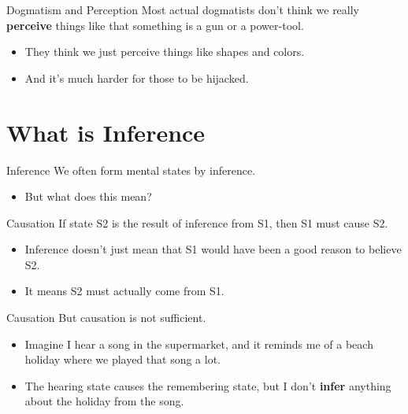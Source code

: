 \documentclass[
  17pt,
  letterpaper,
  ignorenonframetext,
  aspectratio=169,
  xcolor={dvipsnames}]{beamer}
\providecommand{\tightlist}{%
  \setlength{\itemsep}{0pt}\setlength{\parskip}{0pt}}\usepackage{longtable,booktabs,array}
\begin{document}
\begin{frame}{Dogmatism and Perception}
\protect\hypertarget{dogmatism-and-perception}{}
Most actual dogmatists don't think we really \textbf{perceive} things
like that something is a gun or a power-tool.

\begin{itemize}[<+->]
\tightlist
\item
  They think we just perceive things like shapes and colors.
\item
  And it's much harder for those to be hijacked.
\end{itemize}
\end{frame}

\hypertarget{what-is-inference}{%
\section{What is Inference}\label{what-is-inference}}

\begin{frame}{Inference}
\protect\hypertarget{inference}{}
We often form mental states by inference.

\begin{itemize}[<+->]
\tightlist
\item
  But what does this mean?
\end{itemize}
\end{frame}

\begin{frame}{Causation}
\protect\hypertarget{causation}{}
If state S2 is the result of inference from S1, then S1 must cause S2.

\begin{itemize}[<+->]
\tightlist
\item
  Inference doesn't just mean that S1 would have been a good reason to
  believe S2.
\item
  It means S2 must actually come from S1.
\end{itemize}
\end{frame}

\begin{frame}{Causation}
\protect\hypertarget{causation-1}{}
But causation is not sufficient.

\begin{itemize}[<+->]
\tightlist
\item
  Imagine I hear a song in the supermarket, and it reminds me of a beach
  holiday where we played that song a lot.
\item
  The hearing state causes the remembering state, but I don't
  \textbf{infer} anything about the holiday from the song.
\end{itemize}
\end{frame}
\end{document}
